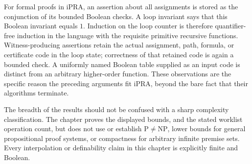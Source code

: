 For formal proofs in iPRA, an assertion about all assignments is stored as
the conjunction of its bounded Boolean checks.  A loop invariant says that
this Boolean invariant equals $1$.  Induction on the loop counter is therefore
quantifier-free induction in the language with the requisite primitive
recursive functions.  Witness-producing assertions retain the actual
assignment, path, formula, or certificate code in the loop state; correctness
of that retained code is again a bounded check.  A uniformly named Boolean
table supplied as an input code is distinct from an arbitrary higher-order
function.  These observations are the specific reason the preceding
arguments fit iPRA, beyond the bare fact that their algorithms terminate.

The breadth of the results should not be confused with a sharp complexity
classification.  The chapter proves the displayed bounds, and the stated
worklist operation count, but does not use or establish $\mathrm P\ne
\mathrm{NP}$, lower bounds for general propositional proof systems, or
compactness for arbitrary infinite premise sets.  Every interpolation or
definability claim in this chapter is explicitly finite and Boolean.
